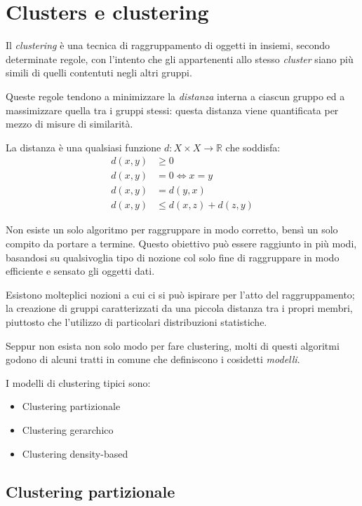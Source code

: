 \chapter{Clusters e clustering}

Il \emph{clustering} è una tecnica di raggruppamento di oggetti in insiemi, secondo determinate regole, con l'intento che gli appartenenti allo stesso \emph{cluster} siano più simili di quelli contentuti negli altri gruppi.

Queste regole tendono a minimizzare la \emph{distanza} interna a ciascun gruppo ed a massimizzare quella tra i gruppi stessi: questa distanza viene quantificata per mezzo di misure di similarità.

La distanza è una qualsiasi funzione $d:X \times X \to \mathbb{R}$ che soddisfa:
\begin{align*}
	d(x,y) &\geq 0 \\
	d(x,y) &= 0 \iff x=y \\
	d(x,y) &= d(y,x) \\
	d(x,y) &\leq d(x,z) + d(z,y)
\end{align*}

Non esiste un solo algoritmo per raggruppare in modo corretto, bensì un solo compito da portare a termine. Questo obiettivo può essere raggiunto in più modi, basandosi su qualsivoglia tipo di nozione col solo fine di raggruppare in modo efficiente e sensato gli oggetti dati. 

Esistono molteplici nozioni a cui ci si può ispirare per l'atto del raggruppamento; la creazione di gruppi caratterizzati da una piccola distanza tra i propri membri, piuttosto che l'utilizzo di particolari distribuzioni statistiche.

Seppur non esista non solo modo per fare clustering, molti di questi algoritmi godono di alcuni tratti in comune che definiscono i cosidetti \emph{modelli}.

I modelli di clustering tipici sono:
\begin{itemize}
	\item Clustering partizionale 
	\item Clustering gerarchico 
	\item Clustering density-based 
\end{itemize}

\section{Clustering partizionale}
	
